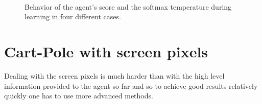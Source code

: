 \documentclass[a4paper, 11pt]{article}
\begin{document}
  \begin{figure}
    \centering
     \quad
     \\
     \quad
    \caption{Behavior of the agent's score and the softmax temperature during learning in four different cases.}
    \label{fig:scores}
  \end{figure}


\section{Cart-Pole with screen pixels}
  Dealing with the screen pixels is much harder than with the high level information provided to the agent so far and so to achieve good results relatively quickly one has to use more advanced methods.
\end{document}
